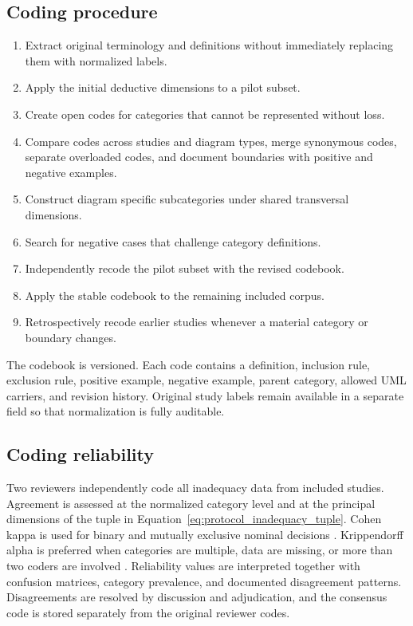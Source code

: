 \subsection{Coding procedure}

\begin{enumerate}[label=\arabic*)]
    \item Extract original terminology and definitions without immediately replacing them with normalized labels.
    \item Apply the initial deductive dimensions to a pilot subset.
    \item Create open codes for categories that cannot be represented without loss.
    \item Compare codes across studies and diagram types, merge synonymous codes, separate overloaded codes, and document boundaries with positive and negative examples.
    \item Construct diagram specific subcategories under shared transversal dimensions.
    \item Search for negative cases that challenge category definitions.
    \item Independently recode the pilot subset with the revised codebook.
    \item Apply the stable codebook to the remaining included corpus.
    \item Retrospectively recode earlier studies whenever a material category or boundary changes.
\end{enumerate}

The codebook is versioned. Each code contains a definition, inclusion rule, exclusion rule, positive example, negative example, parent category, allowed UML carriers, and revision history. Original study labels remain available in a separate field so that normalization is fully auditable.

\subsection{Coding reliability}

Two reviewers independently code all inadequacy data from included studies. Agreement is assessed at the normalized category level and at the principal dimensions of the tuple in Equation~\ref{eq:protocol_inadequacy_tuple}. Cohen kappa is used for binary and mutually exclusive nominal decisions \cite{Cohen1960Kappa}. Krippendorff alpha is preferred when categories are multiple, data are missing, or more than two coders are involved \cite{Krippendorff2018Content}. Reliability values are interpreted together with confusion matrices, category prevalence, and documented disagreement patterns. Disagreements are resolved by discussion and adjudication, and the consensus code is stored separately from the original reviewer codes.


